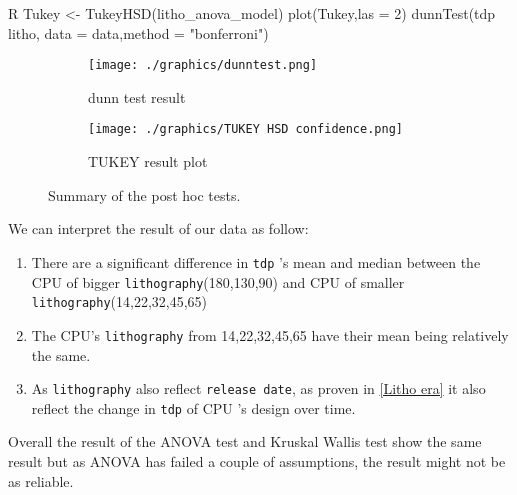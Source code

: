 \begin{code}{R}
    Tukey <- TukeyHSD(litho_anova_model)
    plot(Tukey,las = 2)
    dunnTest(tdp ~ litho, data = data,method = "bonferroni")
\end{code}
\begin{figure}[H]
    \centering
    \begin{subfigure}[b]{0.5\textwidth}
        \centering
        \texttt{[image: ./graphics/dunntest.png]}
        \caption{dunn test result}
        \label{fig:dunntest}
    \end{subfigure}
    \hfill
    \begin{subfigure}[b]{0.45\textwidth}
        \centering
        \texttt{[image: ./graphics/TUKEY HSD confidence.png]}
        \caption{TUKEY result plot}
        \label{fig:TUKEYconfidence}
    \end{subfigure}
    \caption{Summary of the post hoc tests.}
\end{figure}
    

We can interpret the result of our data as follow:
\begin{enumerate}
    \item There are a significant difference in \verb|tdp| 's mean and median between the CPU of bigger \verb|lithography|(180,130,90) and CPU of smaller \verb|lithography|(14,22,32,45,65)
    \item The CPU's \verb|lithography| from 14,22,32,45,65 have their mean being relatively the same.
    \item As \verb|lithography| also reflect \verb|release date|, as proven in \ref{Litho era} it also reflect the change in \verb|tdp| of CPU 's design over time.
    
\end{enumerate}
    
Overall the result of the ANOVA test and Kruskal Wallis test show the same result but as ANOVA has failed a couple of assumptions, the result might not be as reliable. 





